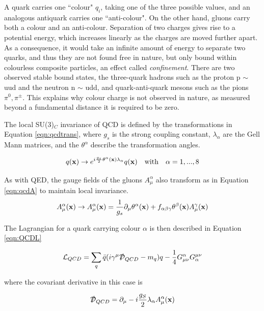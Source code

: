 A quark carries one ``colour" $q_{i}$, taking one of the three possible values, and an analogous antiquark carries one ``anti-colour". On the other hand, gluons carry both a colour and an anti-colour.  Separation of two charges gives rise to a potential energy, which increases linearly as the charges are moved further apart. As a consequence, it would take an infinite amount of energy to separate two quarks, and thus they are not found free in nature, but only bound within colourless composite particles, an effect called \textit{confinement}. There are two observed stable bound states, the three-quark hadrons such as the proton p $\sim$ uud and the neutron n $\sim$ udd, and quark-anti-quark mesons such as the pions $\pi^{0}, \pi^{\pm}$. This explains why colour charge is not observed in nature, as measured beyond a fundamental distance it is required to be zero.

The local SU(3)$_{C}$ invariance of QCD is defined by the transformations in Equation \ref{eqn:qcdtrans}, where $g_{s}$ is the strong coupling constant, $\lambda_{\alpha}$ are the Gell Mann matrices, and the $\theta^{\alpha}$ describe the transformation angles. 

\begin{equation}
q(\mathbf{x}) \rightarrow e^{i\frac{g_{s}}{2}\theta^{\alpha}(\mathbf{x}) \lambda_{\alpha}} q(\mathbf{x}) \quad \mathrm{with} \quad \alpha = 1, ... , 8
\label{eqn:qcdtrans}
\end{equation}


As with QED, the gauge fields of the gluons $A^{\alpha}_{\mu} $ also transform as in Equation \ref{eqn:qcdA} to maintain local invariance. 
\begin{equation}
A^{\alpha}_{\mu}(\mathbf{x}) \rightarrow A^{\alpha}_{\mu}(\mathbf{x}) = \frac{1}{g_{s}} \partial_{\mu}\theta^{\alpha}(\mathbf{x}) + f_{\alpha \beta \gamma}\theta^{\beta}(\mathbf{x})A^{\gamma}_{\mu}(\mathbf{x})
\label{eqn:qcdA}
\end{equation}


The Lagrangian for a quark carrying colour $\alpha$ is then described in Equation \ref{eqn:QCDL}

\begin{equation}
{\mathcal{L}}_{QCD} = \sum_{q} \bar{q}(i \gamma^{\mu}\slashed{\mathcal{D}}_{QCD} - m_{q}) q - \frac{1}{4}G^{\alpha}_{\mu \nu}G^{\mu \nu}_{\alpha}
\label{eqn:QCDL}
\end{equation}

where the covariant derivative in this case is


\begin{equation}
\slashed{\Dev}_{QCD} = \partial_{\mu} - i\frac{g_{S}}{2}\lambda_{\alpha}A^{\alpha}_{\mu}(\stc)
\label{eqn:QCDD}
\end{equation}

